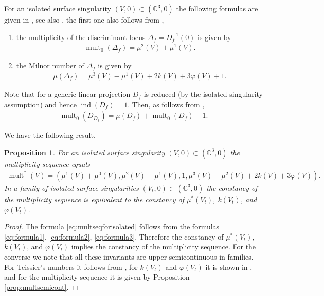 \documentclass[11pt,a4paper]{amsart}
\newcommand{\1}{{1\!\!1}}
\numberwithin{equation}{section}
\theoremstyle{plain}%
\newtheorem{prop}[thm]{Proposition}
\theoremstyle{definition}
\theoremstyle{definition}
\theoremstyle{remark}
\newcommand{\C}{\mathbb{C}}
\renewcommand{\1}{\mathbf{1}}
\newcommand{\inv}{^{-1}}
\DeclareMathOperator{\snu}{mult}
\DeclareMathOperator{\idiscr}{ind}
\DeclareMathOperator{\mult}{mult}
\newcommand{\multseq}{multiplicity sequence }
\begin{document}
For an isolated surface singularity $(V,0)\subset (\C^3,0)$
the following formulas are given in \cite{brianconspederthese}, see also \cite[Proposition 1.1]{brianconhenry80}, the first one also follows from  \cite[Lemme 5.10]{teissierasterisque73}, 
\begin{enumerate}[label=(\alph*)]
\item 
the multiplicity of the discriminant locus $\Delta_{f}= D_{f}\inv(0)$ is given by 
\begin{align}\label{eq:formula1}
\mult_0 (\Delta_{f}) = \mu^2(V) + \mu^1(V) .
\end{align}
\item 
the Milnor number of $\Delta_{f}$ is given by
\begin{align}\label{eq:formula2}
\mu (\Delta_{f}) = \mu^3(V) - \mu^1(V) + 2 k(V) +3\varphi (V) +1 .
\end{align}
\end{enumerate}

Note that for a generic linear projection $D_{f}$ is reduced (by the isolated singularity assumption) and hence $\idiscr (D_{f}) =1 $.  
Then, as follows from  \cite[Lemme 5.10]{teissierasterisque73},  
\begin{align}\label{eq:formula3}
\mult_0 (D_{D_{f}}) = \mu (D_{f}) + \mult_0 (D_{f}) -1 .
\end{align}

We have the following result.

\begin{prop}\label{prop:multseqforisolated}
For an isolated surface singularity $(V,0)\subset (\C^3,0)$ the \multseq equals 
\begin{align}\label{eq:multseqforisolated}
\snu^* (V)  = (\mu^1 (V) + \mu^0 (V), \mu^2 (V) + \mu^1 (V), 1, \mu^3 (V) + \mu^2 (V) + 2 k(V) +3\varphi (V) ).
\end{align}
In a family of isolated surface singularities $(V_t,0)\subset (\C^3,0)$ the constancy of the 
\multseq is equivalent to the constancy of $\mu^*(V_t)$, $k(V_t)$, and $\varphi (V_t)$.  
\end{prop}

\begin{proof}
The formula \eqref{eq:multseqforisolated} follows from the formulas \eqref{eq:formula1}, \eqref{eq:formula2}, \eqref{eq:formula3}.  Therefore the con{}stancy of $\mu^*(V_t)$, $k(V_t)$, and $\varphi (V_t)$ implies the constancy of the multiplicity sequence.  For the converse we note that all these invariants are upper semicontinuous in families.  For Teissier's numbers it follows from \cite{teissierasterisque73}, for $k(V_t)$ and $\varphi (V_t)$ it is shown in \cite{brianconhenry80}, and for the \multseq it is given  by Proposition \ref{prop:multsemicont}.  
\end{proof}
\end{document}
